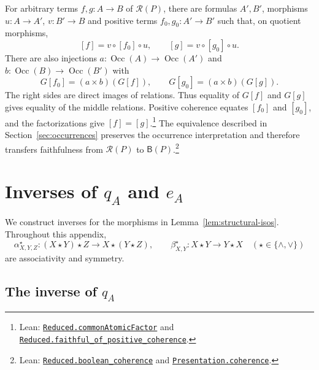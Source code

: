 \documentclass[11pt]{article}
\newcommand{\B}{\mathsf B}
\newcommand{\Occ}{\operatorname{Occ}}
\begin{document}
For arbitrary terms $f,g:A\to B$ of $\mathcal R(P)$, there are
formulas $A',B'$, morphisms
$u:A\to A'$, $v:B'\to B$ and positive terms
$f_0,g_0:A'\to B'$ such that, on quotient morphisms,
\[
 [f]=v\circ[f_0]\circ u,\qquad [g]=v\circ[g_0]\circ u.
\]
There are also injections
$a:\Occ(A)\to\Occ(A')$ and $b:\Occ(B)\to\Occ(B')$ with
\[
 G[f_0]=(a\times b)(G[f]),\qquad
 G[g_0]=(a\times b)(G[g]).
\]
The right sides are direct images of relations. Thus equality
of $G[f]$ and $G[g]$ gives equality of the middle relations.
Positive coherence equates $[f_0]$ and $[g_0]$, and the
factorizations give $[f]=[g]$.\footnote{\raggedright Lean:
\href{https://github.com/flengyel/Dosen-Petric-Maximality/blob/dosen-petric-v25-palomar-v3/DosenPetric/CommonAtomicFactorization.lean\#L51}{\texttt{Reduced.\allowbreak{}commonAtomicFactor}} and
\href{https://github.com/flengyel/Dosen-Petric-Maximality/blob/dosen-petric-v25-palomar-v3/DosenPetric/CommonAtomicFactorization.lean\#L123}{\texttt{Reduced.\allowbreak{}faithful\_of\_positive\_coherence}}.}
The equivalence described in Section~\ref{sec:occurrences}
preserves the occurrence interpretation and therefore transfers
faithfulness from $\mathcal R(P)$ to $\B(P)$.\footnote{\raggedright Lean:
\href{https://github.com/flengyel/Dosen-Petric-Maximality/blob/dosen-petric-v25-palomar-v3/DosenPetric/ReducedCoherence.lean\#L17}{\texttt{Reduced.\allowbreak{}boolean\_coherence}} and
\href{https://github.com/flengyel/Dosen-Petric-Maximality/blob/dosen-petric-v25-palomar-v3/DosenPetric/PresentationCoherence.lean\#L13}{\texttt{Presentation.\allowbreak{}coherence}}.}

\section{Inverses of \texorpdfstring{$q_A$ and $e_A$}{qA and eA}}
\label{app:explicit-inverses}

We construct inverses for the morphisms in
Lemma~\ref{lem:structural-isos}. Throughout this appendix,
\[
 \alpha^\star_{X,Y,Z}:(X\star Y)\star Z\longrightarrow
          X\star(Y\star Z),\qquad
 \beta^\star_{X,Y}:X\star Y\longrightarrow Y\star X
 \quad(\star\in\{\wedge,\vee\})
\]
are associativity and symmetry.

\subsection{The inverse of \texorpdfstring{$q_A$}{qA}}
\end{document}
